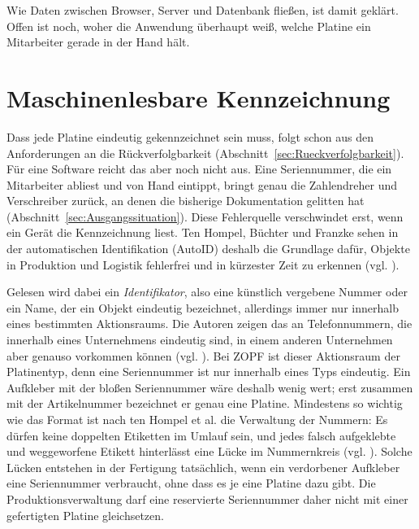 Wie Daten zwischen Browser, Server und Datenbank fließen, ist damit geklärt.
Offen ist noch, woher die Anwendung überhaupt weiß, welche Platine ein
Mitarbeiter gerade in der Hand hält.

\section{Maschinenlesbare Kennzeichnung}
\label{sec:Kennzeichnung}
Dass jede Platine eindeutig gekennzeichnet sein muss, folgt schon aus den
Anforderungen an die Rückverfolgbarkeit (Abschnitt~\ref{sec:Rueckverfolgbarkeit}).
Für eine Software reicht das aber noch nicht aus. Eine Seriennummer, die ein
Mitarbeiter abliest und von Hand eintippt, bringt genau die Zahlendreher und
Verschreiber zurück, an denen die bisherige Dokumentation gelitten hat
(Abschnitt~\ref{sec:Ausgangssituation}). Diese Fehlerquelle verschwindet erst,
wenn ein Gerät die Kennzeichnung liest. Ten Hompel, Büchter und Franzke sehen in
der automatischen Identifikation (AutoID) deshalb die Grundlage dafür, Objekte in
Produktion und Logistik fehlerfrei und in kürzester Zeit zu erkennen (vgl.
\cite[S.~9]{tenhompelIdentifikationssystemeUndAutomatisierung2008}).

Gelesen wird dabei ein \emph{Identifikator}, also eine künstlich vergebene
Nummer oder ein Name, der ein Objekt eindeutig bezeichnet, allerdings immer nur
innerhalb eines bestimmten Aktionsraums. Die Autoren zeigen das an
Telefonnummern, die innerhalb eines Unternehmens eindeutig sind, in einem
anderen Unternehmen aber genauso vorkommen können (vgl.
\cite[S.~12\,f.]{tenhompelIdentifikationssystemeUndAutomatisierung2008}). Bei ZOPF ist dieser
Aktionsraum der Platinentyp, denn eine Seriennummer ist nur innerhalb eines
Typs eindeutig. Ein Aufkleber mit der bloßen Seriennummer wäre deshalb wenig
wert; erst zusammen mit der Artikelnummer bezeichnet er genau eine Platine.
Mindestens so wichtig wie das Format ist nach ten Hompel et al. die Verwaltung der
Nummern: Es dürfen keine doppelten Etiketten im Umlauf sein, und jedes falsch
aufgeklebte und weggeworfene Etikett hinterlässt eine Lücke im Nummernkreis
(vgl. \cite[S.~24]{tenhompelIdentifikationssystemeUndAutomatisierung2008}). Solche Lücken entstehen
in der Fertigung tatsächlich, wenn ein verdorbener Aufkleber eine Seriennummer
verbraucht, ohne dass es je eine Platine dazu gibt. Die Produktionsverwaltung
darf eine reservierte Seriennummer daher nicht mit einer gefertigten Platine
gleichsetzen.

